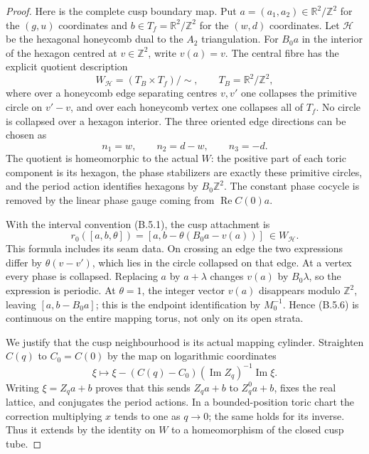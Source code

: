 \begin{proof}
Here is the complete cusp boundary map.  Put
$a=(a_1,a_2)\in\mathbb R^2/\mathbb Z^2$ for the $(g,u)$
coordinates and $b\in T_f=\mathbb R^2/\mathbb Z^2$ for
the $(w,d)$ coordinates.  Let $\mathcal H$ be the hexagonal
honeycomb dual to the $A_2$ triangulation.  For $B_0a$ in
the interior of the hexagon centred at $v\in\mathbb Z^2$,
write $v(a)=v$.  The central fibre has the explicit quotient
description
\[
 W_{\mathcal H}=(T_B\times T_f)/\sim,
 \qquad T_B=\mathbb R^2/\mathbb Z^2,
 \tag{B.5.4}
\]
where over a honeycomb edge separating centres $v,v'$ one
collapses the primitive circle on $v'-v$, and over each
honeycomb vertex one collapses all of $T_f$.  No circle is
collapsed over a hexagon interior.  The three oriented edge
directions can be chosen as
\[
 n_1=w,\qquad n_2=d-w,\qquad n_3=-d.
 \tag{B.5.5}
\]
The quotient is homeomorphic to the actual $W$: the positive
part of each toric component is its hexagon, the phase
stabilizers are exactly these primitive circles, and the
period action identifies hexagons by $B_0\mathbb Z^2$.
The constant phase cocycle is removed by the linear phase
gauge coming from $\operatorname{Re}C(0)a$.

With the interval convention (B.5.1), the cusp attachment is
\[
 r_0([a,b,\theta])
   =[a,b-\theta(B_0a-v(a))]\ \in W_{\mathcal H}.
 \tag{B.5.6}
\]
This formula includes its seam data.  On crossing an edge
the two expressions differ by $\theta(v-v')$, which lies
in the circle collapsed on that edge.  At a vertex every
phase is collapsed.  Replacing $a$ by $a+\lambda$ changes
$v(a)$ by $B_0\lambda$, so the expression is periodic.
At $\theta=1$, the integer vector $v(a)$ disappears modulo
$\mathbb Z^2$, leaving $[a,b-B_0a]$; this is the endpoint
identification by $M_0^{-1}$.  Hence (B.5.6) is continuous
on the entire mapping torus, not only on its open strata.

We justify that the cusp neighbourhood is its actual
mapping cylinder.  Straighten $C(q)$ to $C_0=C(0)$ by
the map on logarithmic coordinates
\[
 \xi\longmapsto
 \xi-(C(q)-C_0)(\operatorname{Im}Z_q)^{-1}
                       \operatorname{Im}\xi.
 \tag{B.5.7}
\]
Writing $\xi=Z_qa+b$ proves that this sends $Z_qa+b$ to
$Z_q^0a+b$, fixes the real lattice, and conjugates the
period actions.  In a bounded-position toric chart the
correction multiplying $x$ tends to one as $q\to0$;
the same holds for its inverse.  Thus it extends by the
identity on $W$ to a homeomorphism of the closed cusp tube.


\end{proof}
